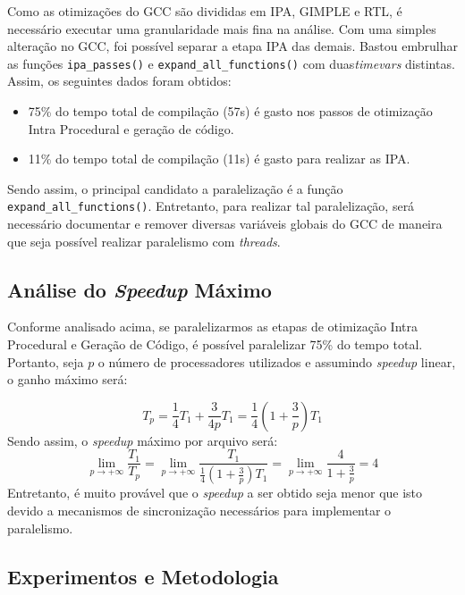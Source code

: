 Como as otimizações do GCC são divididas em IPA, GIMPLE e RTL, é necessário
executar uma granularidade mais fina na análise. Com uma simples alteração
no GCC, foi possível separar a etapa IPA das demais. Bastou embrulhar as funções
\texttt{ipa\_passes()} e \texttt{expand\_all\_functions()} com duas\textit{timevars}
distintas. Assim, os seguintes dados foram obtidos:
\begin{itemize}
    \item 75\% do tempo total de compilação (57s) é gasto nos passos de otimização
        Intra Procedural e geração de código.

    \item 11\% do tempo total de compilação (11s) é gasto para realizar as IPA.
\end{itemize}
Sendo assim, o principal candidato a paralelização é a função \texttt{expand\_all\_functions()}.
Entretanto, para realizar tal paralelização, será necessário documentar e remover diversas
variáveis globais do GCC de maneira que seja possível realizar paralelismo com \textit{threads}.

\subsection{Análise do \textit{Speedup} Máximo}

Conforme analisado acima, se paralelizarmos as etapas de otimização Intra
Procedural e Geração de Código, é possível paralelizar 75\% do tempo total.
Portanto, seja $p$ o número de processadores utilizados e assumindo
\textit{speedup} linear, o ganho máximo será:

$$ T_p = \frac{1}{4} T_1 + \frac{3}{4p}T_1 = \frac{1}{4} \left( 1 + \frac{3}{p}
\right)T_1 $$ Sendo assim, o \textit{speedup} máximo por arquivo será: $$
\lim_{p \rightarrow +\infty} \frac{T_1}{T_p} = \lim_{p \rightarrow +\infty}
\frac{T_1}{\frac{1}{4} \left( 1 + \frac{3}{p} \right)T_1} = \lim_{p \rightarrow
+\infty} \frac{4}{1 + \frac{3}{p}} = 4$$
Entretanto, é muito provável que o \textit{speedup} a ser obtido seja menor que isto
devido a mecanismos de sincronização necessários para implementar o paralelismo.

\subsection{Experimentos e Metodologia}


